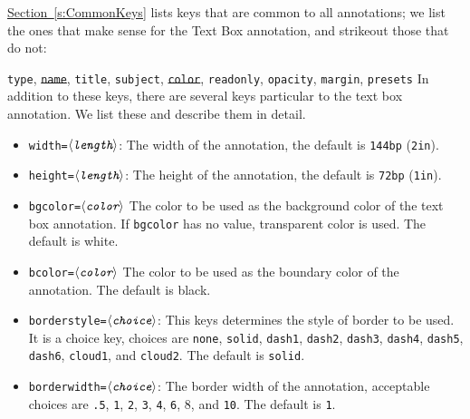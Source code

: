 \documentclass[12pt]{article}
\makeatletter
\let\opt\texttt
\let\uif\textsf
\def\ameta#1{$\langle\textit{\texttt{#1}}\rangle$}
\renewenvironment{quote}[1][]
   {\def\@rgi{#1}\ifx\@rgi\@empty
    \let\rghtm\@empty\else\def\rghtm{\rightmargin\leftmargin}\fi
    \list{}{\rghtm} %
    \item\relax}
   {\endlist}
\makeatother
\begin{document}
\hyperref[s:CommonKeys]{Section~\ref*{s:CommonKeys}} lists keys that are
common to all annotations; we list the ones that make sense for the \uif{Text
Box} annotation, and strikeout those that do not:
\begin{quote}\raggedright
\texttt{type}, \texttt{\st{name}}, \texttt{title}, \texttt{subject},
\texttt{\st{color}}, \texttt{readonly}, \texttt{opacity}, \texttt{margin},
\texttt{presets}
\end{quote}
In addition to these keys,  there are several keys particular to the text box
annotation. We list these and describe them in detail.
\begin{itemize}
    \item \texttt{width=\ameta{length}}: The width of the annotation, the
        default is \texttt{144bp} (\texttt{2in}).
    \item \texttt{height=\ameta{length}}: The height of the annotation, the
        default is \texttt{72bp} (\texttt{1in}).
    \item \texttt{bgcolor=\ameta{color}} The color to be used as the background color
    of the text box annotation. If \opt{bgcolor} has no value, transparent color is used.
    The default is white.
    \item \texttt{bcolor=\ameta{color}} The color to be used as the boundary color of the
    annotation. The default is black.
    \item \texttt{borderstyle=\ameta{choice}}: This keys determines the
        style of border to be used. It is a choice key, choices are
        \texttt{none}, \texttt{solid}, \texttt{dash1}, \texttt{dash2},
        \texttt{dash3}, \texttt{dash4}, \texttt{dash5}, \texttt{dash6},
        \texttt{cloud1}, and \texttt{cloud2}. The default is  \texttt{solid}.
    \item \texttt{borderwidth=\ameta{choice}}: The border width of the
        annotation, acceptable choices are  \texttt{.5}, \texttt{1}, \texttt{2},
        \texttt{3}, \texttt{4}, \texttt{6}, 8, and \texttt{10}. The default is \texttt{1}.
\end{itemize}
\begin{textboxpara}
\end{textboxpara}%
\end{document}
